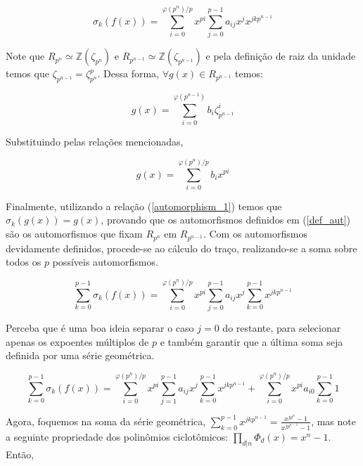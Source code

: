 \begin{equation}
    \sigma_k(f(x)) = \sum_{i=0}^{\varphi(p^n)/p} x^{pi} \sum_{j=0}^{p-1} a_{ij} x^j x^{j k p^{n-1}}
    \label{automorphism_1}
\end{equation}

Note que $R_{p^{n}} \simeq \mathbb{Z}(\zeta_{p^{n}})$ e $R_{p^{n-1}} \simeq \mathbb{Z}(\zeta_{p^{n-1}})$ e pela definição de raiz da unidade temos que
$\zeta_{p^{n-1}} = \zeta_{p^{n}}^p$. Dessa forma, $\forall g(x) \in R_{p^{n-1}}$ temos:

\begin{equation}
    g(x) = \sum_{i=0}^{\varphi(p^{n-1})} b_i \zeta_{p^{n-1}}^i
\end{equation}

Substituindo pelas relações mencionadas,

\begin{equation}
    g(x) = \sum_{i=0}^{\varphi(p^{n})/p} b_i x^{pi}
\end{equation}

Finalmente, utilizando a relação (\ref{automorphism_1}) temos que $\sigma_k(g(x)) = g(x)$, provando que 
os automorfismos definidos em (\ref{def_aut}) são os automorfismos que fixam $R_{p^{n}}$ em $R_{p^{n-1}}$. Com os automorfismos devidamente 
definidos, procede-se ao cálculo do traço, realizando-se a soma sobre todos os $p$ possíveis automorfismos.

\begin{equation}
    \sum_{k=0}^{p-1} \sigma_k(f(x)) = \sum_{i=0}^{\varphi(p^n)/p} x^{pi} \sum_{j=0}^{p-1} a_{ij} x^j \sum_{k=0}^{p-1} x^{j k p^{n-1}}
\end{equation}

Perceba que é uma boa ideia separar o caso $j=0$ do restante, para selecionar apenas os expoentes múltiplos de $p$ e também garantir que a última soma seja definida por uma série geométrica.

\begin{equation}
    \sum_{k=0}^{p-1} \sigma_k(f(x)) = \sum_{i=0}^{\varphi(p^n)/p} x^{pi} \sum_{j=1}^{p-1} a_{ij} x^j \sum_{k=0}^{p-1} x^{j k p^{n-1}} + 
                                                        \sum_{i=0}^{\varphi(p^n)/p} x^{pi} a_{i0} \sum_{k=0}^{p-1} 1
\end{equation}

Agora, foquemos na soma da série geométrica, $\sum_{k=0}^{p-1} x^{j k p^{n-1}} = \frac{x^{j p^{n}} - 1}{x^{j p^{n-1}} -1}$, mas note a seguinte propriedade dos polinômios ciclotômicos: $\prod_{d|n} \Phi_d(x) = x^n - 1$. Então,


